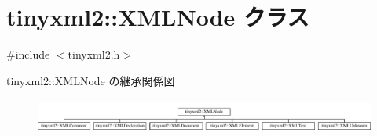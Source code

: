 \hypertarget{classtinyxml2_1_1_x_m_l_node}{}\section{tinyxml2\+:\+:X\+M\+L\+Node クラス}
\label{classtinyxml2_1_1_x_m_l_node}


{\ttfamily \#include $<$tinyxml2.\+h$>$}

tinyxml2\+:\+:X\+M\+L\+Node の継承関係図\begin{figure}[H]
\begin{center}
\leavevmode
\includegraphics[height=1.145194cm]{classtinyxml2_1_1_x_m_l_node}
\end{center}
\end{figure}
